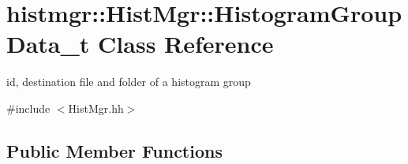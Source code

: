 \section{histmgr\-:\-:Hist\-Mgr\-:\-:Histogram\-Group\-Data\-\_\-t Class Reference}
\label{classhistmgr_1_1HistMgr_1_1HistogramGroupData__t}


id, destination file and folder of a histogram group  




{\ttfamily \#include $<$Hist\-Mgr.\-hh$>$}

\subsection*{Public Member Functions}
